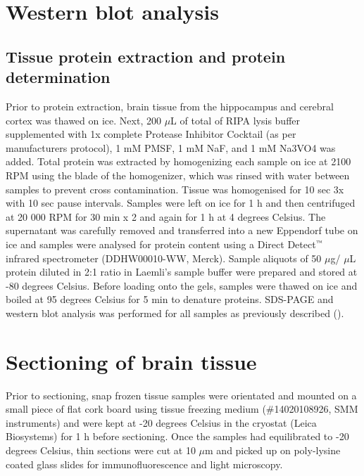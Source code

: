 \section{Western blot analysis}
\subsection{Tissue protein extraction and protein determination}
Prior to protein extraction, brain tissue from the hippocampus and cerebral cortex was thawed on ice. Next, 200 $\mu$L of total of RIPA lysis buffer supplemented with 1x complete Protease Inhibitor Cocktail (as per manufacturers protocol), 1 mM PMSF, 1 mM NaF, and 1 mM Na3VO4 was added. Total protein was extracted by homogenizing each sample on ice at 2100 RPM using the blade of the homogenizer, which was rinsed with water between samples to prevent cross contamination. Tissue was homogenised for 10 sec 3x with 10 sec pause intervals. Samples were left on ice for 1 h and then centrifuged at 20 000 RPM for 30 min x 2 and again for 1 h at 4 degrees Celsius. The supernatant was carefully removed and transferred into a new Eppendorf tube on ice and samples were analysed for protein content using a Direct Detect${\textsuperscript{\tiny{\texttrademark}}}$ infrared spectrometer (DDHW00010-WW, Merck). Sample aliquots of 50 $\mu$g/ $\mu$L protein diluted in 2:1 ratio in Laemli's sample buffer were prepared and stored at -80 degrees Celsius. Before loading onto the gels, samples were thawed on ice and boiled at 95 degrees Celsius for 5 min to denature proteins. SDS-PAGE and western blot analysis was performed for all samples as previously described (). 

\section{Sectioning of brain tissue}
Prior to sectioning, snap frozen tissue samples were orientated and mounted on a small piece of flat cork board using tissue freezing medium (\#14020108926, SMM instruments) and were kept at -20 degrees Celsius in the cryostat (Leica Biosystems) for 1 h before sectioning. Once the samples had equilibrated to -20 degrees Celsius, thin sections were cut at 10 $\mu$m and picked up on poly-lysine coated glass slides for immunofluorescence and light microscopy.

